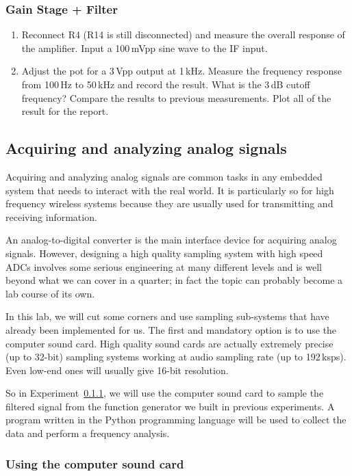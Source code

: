 \documentclass[letterpaper, 11pt]{article}
\begin{document}
\subsubsection{Gain Stage + Filter}
\begin{enumerate}
	\item Reconnect R4 (R14 is still disconnected) and measure the overall response of the amplifier. Input a 100\,mVpp sine wave to the IF input. 
	
	\item Adjust the pot for a 3\,Vpp output at 1\,kHz. Measure the frequency response from 100\,Hz to 50\,kHz and record the result. What is the 3\,dB cutoff frequency? Compare the results to previous measurements. Plot all of the result for the report.

\end{enumerate}


\subsection{Acquiring and analyzing analog signals}
\label{sec:adc}

Acquiring and analyzing analog signals are common tasks in any embedded system that needs to interact with the real world. It is particularly so for high frequency wireless systems because they are usually used for transmitting and receiving information. 

An analog-to-digital converter is the main interface device for acquiring analog signals. However, designing a high quality sampling system with high speed ADCs involves some serious engineering at many different levels and is well beyond what we can cover in a quarter; in fact the topic can probably become a lab course of its own. 

In this lab, we will cut some corners and use sampling sub-systems that have already been implemented for us. The first and mandatory option is to use the computer sound card. High quality sound cards are actually extremely precise (up to 32-bit) sampling systems working at audio sampling rate (up to 192\,ksps). Even low-end ones will usually give 16-bit resolution.

So in Experiment~\ref{sec:soundcard}, we will use the computer sound card to sample the filtered signal from the function generator we built in previous experiments. A program written in the Python programming language will be used to collect the data and perform a frequency analysis. 

\subsubsection{Using the computer sound card}
\label{sec:soundcard}
\end{document}
